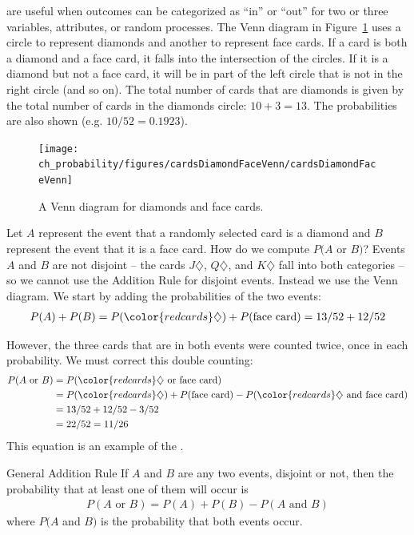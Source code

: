  are useful when outcomes can be categorized as ``in'' or ``out'' for two or three variables, attributes, or random processes. The Venn diagram in Figure~\ref{cardsDiamondFaceVenn} uses a circle to represent diamonds and another to represent face cards. If a card is both a diamond and a face card, it falls into the intersection of the circles. If it is a diamond but not a face card, it will be in part of the left circle that is not in the right circle (and so on). The total number of cards that are diamonds is given by the total number of cards in the diamonds circle: $10+3=13$. The probabilities are also shown (e.g. $10/52 = 0.1923$).

\begin{figure}[h]
\centering
\texttt{[image: ch\_probability/figures/cardsDiamondFaceVenn/cardsDiamondFaceVenn]}
\caption{A Venn diagram for diamonds and face cards.}
\label{cardsDiamondFaceVenn}
\end{figure}

Let $A$ represent the event that a randomly selected card is a diamond and $B$ represent the event that it is a face card. How do we compute $P(A$ or $B)$? Events $A$ and $B$ are not disjoint -- the cards {\color{redcards}$J\diamondsuit$}, {\color{redcards}$Q\diamondsuit$}, and {\color{redcards}$K\diamondsuit$} fall into both categories -- so we cannot use the Addition Rule for disjoint events. Instead we use the Venn diagram. We start by adding the probabilities of the two events:
\begin{align*}
P(A) + P(B)
  = P({\color{redcards}\diamondsuit}) + P(\text{face card})
  = 13/52 + 12/52
\end{align*}

\D{\newpage}

\noindent%
However, the three cards that are in both events were counted twice, once in each probability. We must correct this double counting:
\begin{align*}
P(A\text{ or } B)
  &= P({\color{redcards}\diamondsuit}\text{ or face card}) \\
  &= P({\color{redcards}\diamondsuit}) + P(\text{face card})
      - P({\color{redcards}\diamondsuit}\text{ and face card}) \\
  &= 13/52 + 12/52 - 3/52 \\
  &= 22/52 = 11/26
\end{align*}
This equation is an example of the . 

\begin{onebox}{General Addition Rule}
  If $A$ and $B$ are any two events, disjoint or not, then
  the probability that at least one of them will occur is
  \begin{align*}
  P(A\text{ or }B) = P(A) + P(B) - P(A\text{ and }B)
  \end{align*}
  where $P(A$ and $B)$ is the probability that both events occur.
\end{onebox}

